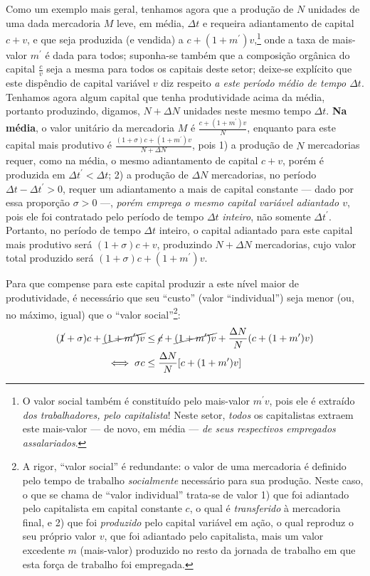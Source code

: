 Como um exemplo mais geral, tenhamos agora que a produção de \(N\) unidades de uma dada mercadoria \(M\) leve, em média, \(\Delta t\) e requeira adiantamento de capital \(c+v\), e que seja produzida (e vendida) a \(c+(1+m^{\prime})v\),\footnote{O valor social também é constituído pelo mais-valor \(m^{\prime}v\), pois ele é extraído \textit{dos trabalhadores, pelo capitalista}! Neste setor, \textit{todos} os capitalistas extraem este mais-valor --- de novo, em média --- \textit{de seus respectivos empregados assalariados}.} onde a taxa de mais-valor \(m^\prime\) é dada para todos; suponha-se também que a composição orgânica do capital \(\frac{c}{v}\) seja a mesma para todos os capitais deste setor; deixe-se explícito que este dispêndio de capital variável \(v\) diz respeito \textit{a este período médio de tempo \(\Delta t\)}. Tenhamos agora algum capital que tenha produtividade acima da média, portanto produzindo, digamos, \(N+\Delta N\) unidades neste mesmo tempo \(\Delta t\). \textbf{Na média}, o valor unitário da mercadoria \(M\) é \(\frac{c+(1+m^{\prime})v}{N}\), enquanto para este capital mais produtivo é \(\frac{(1+\sigma)c+(1+m^{\prime})v}{N+\Delta N}\), pois 1) a produção de \(N\) mercadorias requer, como na média, o mesmo adiantamento de capital \(c+v\), porém é produzida em \(\Delta t^{\prime}<\Delta t\); 2) a produção de \(\Delta N\) mercadorias, no período \(\Delta t-\Delta t^{\prime}>0\), requer um adiantamento a mais de capital constante --- dado por essa proporção $\sigma > 0$ ---, \textit{porém emprega o mesmo capital variável adiantado \(v\)}, pois ele foi contratado pelo período de tempo \(\Delta t\) \textit{inteiro}, não somente \(\Delta t^{\prime}\). Portanto, no período de tempo \(\Delta t\) inteiro, o capital adiantado para este capital mais produtivo será \((1+\sigma)c + v\), produzindo \(N+\Delta N\) mercadorias, cujo valor total produzido será \((1+\sigma)c + (1+m^{\prime})v\).

Para que compense para este capital produzir a este nível maior de produtividade, é necessário que seu ``custo'' (valor ``individual'') seja menor (ou, no máximo, igual) que o ``valor social''\footnote{A rigor, ``valor social'' é redundante: o valor de uma mercadoria é definido pelo tempo de trabalho \textit{socialmente} necessário para sua produção. Neste caso, o que se chama de ``valor individual'' trata-se de valor 1) que foi adiantado pelo capitalista em capital constante $c$, o qual é \textit{transferido} à mercadoria final, e 2) que foi \textit{produzido} pelo capital variável em ação, o qual reproduz o seu próprio valor $v$, que foi adiantado pelo capitalista, mais um valor excedente $m$ (mais-valor) produzido no resto da jornada de trabalho em que esta força de trabalho foi empregada.}: 
\begin{align*}
(\cancel{ 1 }+\sigma)c + \cancel{ (1 +m^{\prime})v } &\leq \cancel{ c }+\cancel{ (1+m^{\prime})v } + \frac{\Delta N}{N}(c+(1+m^{\prime})v) \\
\iff \sigma c & \leq \frac{\Delta N}{N}[c+(1+m^{\prime})v]
\end{align*}

